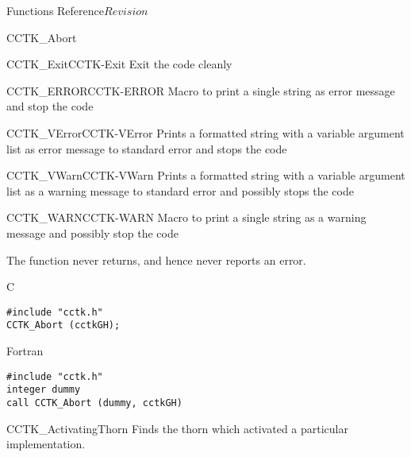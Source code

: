 \begin{cactuspart}{ Functions Reference}{}{$Revision$}
\begin{FunctionDescription}{CCTK\_Abort}
\begin{SeeAlsoSection}
\begin{SeeAlso2}{CCTK\_Exit}{CCTK-Exit}
Exit the code cleanly
\end{SeeAlso2}
\begin{SeeAlso2}{CCTK\_ERROR}{CCTK-ERROR}
Macro to print a single string as error message and stop the code
\end{SeeAlso2}
\begin{SeeAlso2}{CCTK\_VError}{CCTK-VError}
Prints a formatted string with a variable argument list as error
message to standard error and stops the code
\end{SeeAlso2}
\begin{SeeAlso2}{CCTK\_VWarn}{CCTK-VWarn}
Prints a formatted string with a variable argument list as a warning
message to standard error and possibly stops the code
\end{SeeAlso2}
\begin{SeeAlso2}{CCTK\_WARN}{CCTK-WARN}
Macro to print a single string as a warning message and possibly stop the code
\end{SeeAlso2}
\end{SeeAlsoSection}

\begin{ErrorSection}
\begin{Error}{}
The function never returns, and hence never reports an error.
\end{Error}
\end{ErrorSection}

\begin{ExampleSection}
\begin{Example}{C}
\begin{verbatim}
#include "cctk.h"
CCTK_Abort (cctkGH);
\end{verbatim}
\end{Example}
\begin{Example}{Fortran}
\begin{verbatim}
#include "cctk.h"
integer dummy
call CCTK_Abort (dummy, cctkGH)
\end{verbatim}
\end{Example}
\end{ExampleSection}
\end{FunctionDescription}



\begin{FunctionDescription}{CCTK\_ActivatingThorn}
\label{CCTK-ActivatingThorn}
Finds the thorn which activated a particular implementation.


\end{FunctionDescription}
\end{cactuspart}
